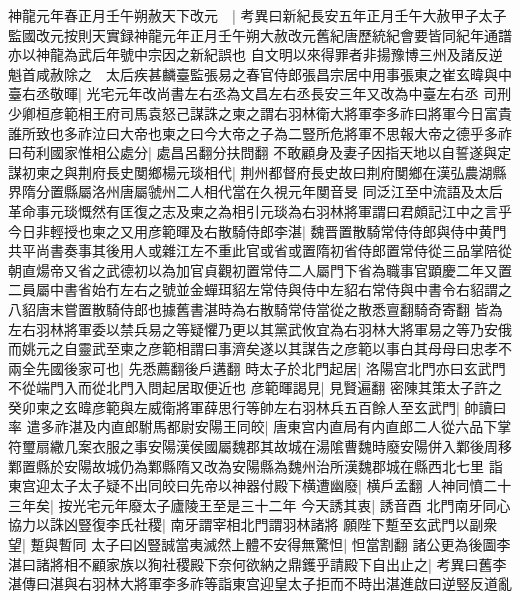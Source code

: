 神龍元年春正月壬午朔赦天下改元　|{
	考異曰新紀長安五年正月壬午大赦甲子太子監國改元按則天實録神龍元年正月壬午朔大赦改元舊紀唐歷統紀會要皆同紀年通譜亦以神龍為武后年號中宗因之新紀誤也}
自文明以來得罪者非揚豫博三州及諸反逆魁首咸赦除之　太后疾甚麟臺監張易之春官侍郎張昌宗居中用事張東之崔玄暐與中臺右丞敬暉|{
	光宅元年改尚書左右丞為文昌左右丞長安三年又改為中臺左右丞}
司刑少卿桓彦範相王府司馬袁怒己謀誅之柬之謂右羽林衛大將軍李多祚曰將軍今日富貴誰所致也多祚泣曰大帝也柬之曰今大帝之子為二豎所危將軍不思報大帝之德乎多祚曰苟利國家惟相公處分|{
	處昌呂翻分扶問翻}
不敢顧身及妻子因指天地以自誓遂與定謀初柬之與荆府長史閺鄉楊元琰相代|{
	荆州都督府長史故曰荆府閺鄉在漢弘農湖縣界隋分置縣屬洛州唐屬虢州二人相代當在久視元年閺音旻}
同泛江至中流語及太后革命事元琰慨然有匡復之志及柬之為相引元琰為右羽林將軍謂曰君頗記江中之言乎今日非輕授也柬之又用彦範暉及右散騎侍郎李湛|{
	魏晋置散騎常侍侍郎與侍中黄門共平尚書奏事其後用人或雜江左不重此官或省或置隋初省侍郎置常侍從三品掌陪從朝直煬帝又省之武德初以為加官貞觀初置常侍二人屬門下省為職事官顕慶二年又置二員屬中書省始冇左右之號並金蟬珥貂左常侍與侍中左貂右常侍與中書令右貂謂之八貂唐末嘗置散騎侍郎也據舊書湛時為右散騎常侍當從之散悉亶翻騎奇寄翻}
皆為左右羽林將軍委以禁兵易之等疑懼乃更以其黨武攸宜為右羽林大將軍易之等乃安俄而姚元之自靈武至柬之彦範相謂曰事濟矣遂以其謀告之彦範以事白其母母曰忠孝不兩全先國後家可也|{
	先悉薦翻後戶遘翻}
時太子於北門起居|{
	洛陽宫北門亦曰玄武門不從端門入而從北門入問起居取便近也}
彦範暉謁見|{
	見賢遍翻}
密陳其策太子許之癸卯柬之玄暐彦範與左威衛將軍薛思行等帥左右羽林兵五百餘人至玄武門|{
	帥讀曰率}
遣多祚湛及内直郎駙馬都尉安陽王同皎|{
	唐東宫内直局有内直郎二人從六品下掌符璽扇繖几案衣服之事安陽漢侯國屬魏郡其故城在湯隂曹魏時廢安陽併入鄴後周移鄴置縣於安陽故城仍為鄴縣隋又改為安陽縣為魏州治所漢魏郡城在縣西北七里}
詣東宫迎太子太子疑不出同皎曰先帝以神器付殿下横遭幽廢|{
	横戶孟翻}
人神同憤二十三年矣|{
	按光宅元年廢太子廬陵王至是三十二年}
今天誘其衷|{
	誘音酉}
北門南牙同心協力以誅凶豎復李氏社稷|{
	南牙謂宰相北門謂羽林諸將}
願陛下蹔至玄武門以副衆望|{
	蹔與暫同}
太子曰凶豎誠當夷滅然上體不安得無驚怛|{
	怛當割翻}
諸公更為後圖李湛曰諸將相不顧家族以狥社稷殿下奈何欲納之鼎鑊乎請殿下自出止之|{
	考異曰舊李湛傳曰湛與右羽林大將軍李多祚等詣東宫迎皇太子拒而不時出湛進啟曰逆竪反道亂}


